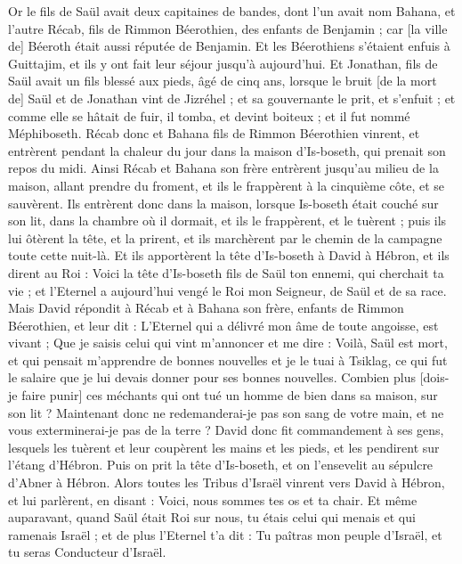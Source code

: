 \begin{multicols}{2}
Or le fils de Saül avait deux capitaines de bandes, dont l'un avait nom Bahana, et l'autre Récab, fils de Rimmon Béerothien, des enfants de Benjamin ; car [la ville de] Béeroth était aussi réputée de Benjamin.
Et les Béerothiens s'étaient enfuis à Guittajim, et ils y ont fait leur séjour jusqu'à aujourd'hui.
Et Jonathan, fils de Saül avait un fils blessé aux pieds, âgé de cinq ans, lorsque le bruit [de la mort de] Saül et de Jonathan vint de Jizréhel ; et sa gouvernante le prit, et s'enfuit ; et comme elle se hâtait de fuir, il tomba, et devint boiteux ; et il fut nommé Méphiboseth.
Récab donc et Bahana fils de Rimmon Béerothien vinrent, et entrèrent pendant la chaleur du jour dans la maison d'Is-boseth, qui prenait son repos du midi.
Ainsi Récab et Bahana son frère entrèrent jusqu'au milieu de la maison, allant prendre du froment, et ils le frappèrent à la cinquième côte, et se sauvèrent.
Ils entrèrent donc dans la maison, lorsque Is-boseth était couché sur son lit, dans la chambre où il dormait, et ils le frappèrent, et le tuèrent ; puis ils lui ôtèrent la tête, et la prirent, et ils marchèrent par le chemin de la campagne toute cette nuit-là.
Et ils apportèrent la tête d'Is-boseth à David à Hébron, et ils dirent au Roi : Voici la tête d'Is-boseth fils de Saül ton ennemi, qui cherchait ta vie ; et l'Eternel a aujourd'hui vengé le Roi mon Seigneur, de Saül et de sa race.
Mais David répondit à Récab et à Bahana son frère, enfants de Rimmon Béerothien, et leur dit : L'Eternel qui a délivré mon âme de toute angoisse, est vivant ;
Que je saisis celui qui vint m'annoncer et me dire : Voilà, Saül est mort, et qui pensait m'apprendre de bonnes nouvelles et je le tuai à Tsiklag, ce qui fut le salaire que je lui devais donner pour ses bonnes nouvelles.
Combien plus [dois-je faire punir] ces méchants qui ont tué un homme de bien dans sa maison, sur son lit ? Maintenant donc ne redemanderai-je pas son sang de votre main, et ne vous exterminerai-je pas de la terre ?
David donc fit commandement à ses gens, lesquels les tuèrent et leur coupèrent les mains et les pieds, et les pendirent sur l'étang d'Hébron. Puis on prit la tête d'Is-boseth, et on l'ensevelit au sépulcre d'Abner à Hébron.
\VerseOne{}Alors toutes les Tribus d'Israël vinrent vers David à Hébron, et lui parlèrent, en disant : Voici, nous sommes tes os et ta chair.
Et même auparavant, quand Saül était Roi sur nous, tu étais celui qui menais et qui ramenais Israël ; et de plus l'Eternel t'a dit : Tu paîtras mon peuple d'Israël, et tu seras Conducteur d'Israël.

\end{multicols}
